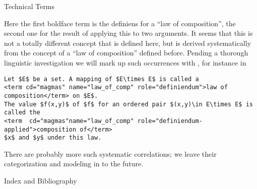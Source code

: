 \begin{module}[id=mtext]
\begin{omgroup}[id=mtext,short=Mathematical Text]
\begin{omgroup}[id=terms]{Technical Terms}
\begin{sblockquote}
  {} {}
\end{sblockquote}
Here the first boldface term is the definiens for a ``law of composition'', the second one
for the result of applying this to two arguments. It seems that this is not a totally
different concept that is defined here, but is derived systematically from the concept of
a ``law of composition'' defined before. Pending a thorough linguistic investigation we
will mark up such occurrences with {}, for instance in

\begin{lstlisting}[mathescape,caption={Marking up the Technical Terms},label=lst:terms]
Let $E$ be a set. A mapping of $E\times E$ is called a 
<term cd="magmas" name="law_of_comp" role="definiendum">law of composition</term> on $E$. 
The value $f(x,y)$ of $f$ for an ordered pair $(x,y)\in E\times E$ is called the 
<term  cd="magmas"name="law_of_comp" role="definiendum-applied">composition of</term>
$x$ and $y$ under this law.
\end{lstlisting}
There are probably more such systematic correlations; we leave their categorization and
modeling in {\omdoc} to the future.
\end{omgroup}

\begin{omgroup}[id=rt]{Index and Bibliography}




\end{omgroup}
\end{omgroup}
\end{module}

